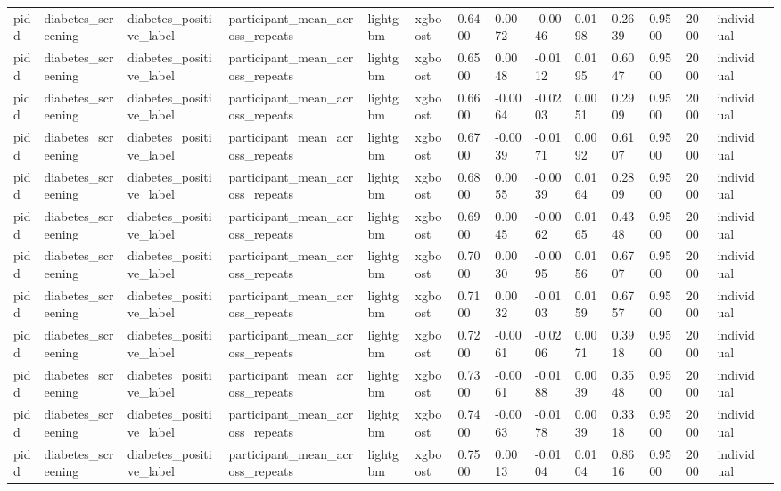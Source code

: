 \begin{tabular}{lllllllllllllll}
pidd & diabetes\_screening & diabetes\_positive\_label & participant\_mean\_across\_repeats & lightgbm & xgboost & 0.6400 & 0.0072 & -0.0046 & 0.0198 & 0.2639 & 0.9500 & 2000 & individual &  \\
pidd & diabetes\_screening & diabetes\_positive\_label & participant\_mean\_across\_repeats & lightgbm & xgboost & 0.6500 & 0.0048 & -0.0112 & 0.0195 & 0.6047 & 0.9500 & 2000 & individual &  \\
pidd & diabetes\_screening & diabetes\_positive\_label & participant\_mean\_across\_repeats & lightgbm & xgboost & 0.6600 & -0.0064 & -0.0203 & 0.0051 & 0.2909 & 0.9500 & 2000 & individual &  \\
pidd & diabetes\_screening & diabetes\_positive\_label & participant\_mean\_across\_repeats & lightgbm & xgboost & 0.6700 & -0.0039 & -0.0171 & 0.0092 & 0.6107 & 0.9500 & 2000 & individual &  \\
pidd & diabetes\_screening & diabetes\_positive\_label & participant\_mean\_across\_repeats & lightgbm & xgboost & 0.6800 & 0.0055 & -0.0039 & 0.0164 & 0.2809 & 0.9500 & 2000 & individual &  \\
pidd & diabetes\_screening & diabetes\_positive\_label & participant\_mean\_across\_repeats & lightgbm & xgboost & 0.6900 & 0.0045 & -0.0062 & 0.0165 & 0.4348 & 0.9500 & 2000 & individual &  \\
pidd & diabetes\_screening & diabetes\_positive\_label & participant\_mean\_across\_repeats & lightgbm & xgboost & 0.7000 & 0.0030 & -0.0095 & 0.0156 & 0.6707 & 0.9500 & 2000 & individual &  \\
pidd & diabetes\_screening & diabetes\_positive\_label & participant\_mean\_across\_repeats & lightgbm & xgboost & 0.7100 & 0.0032 & -0.0103 & 0.0159 & 0.6757 & 0.9500 & 2000 & individual &  \\
pidd & diabetes\_screening & diabetes\_positive\_label & participant\_mean\_across\_repeats & lightgbm & xgboost & 0.7200 & -0.0061 & -0.0206 & 0.0071 & 0.3918 & 0.9500 & 2000 & individual &  \\
pidd & diabetes\_screening & diabetes\_positive\_label & participant\_mean\_across\_repeats & lightgbm & xgboost & 0.7300 & -0.0061 & -0.0188 & 0.0039 & 0.3548 & 0.9500 & 2000 & individual &  \\
pidd & diabetes\_screening & diabetes\_positive\_label & participant\_mean\_across\_repeats & lightgbm & xgboost & 0.7400 & -0.0063 & -0.0178 & 0.0039 & 0.3318 & 0.9500 & 2000 & individual &  \\
pidd & diabetes\_screening & diabetes\_positive\_label & participant\_mean\_across\_repeats & lightgbm & xgboost & 0.7500 & 0.0013 & -0.0104 & 0.0104 & 0.8616 & 0.9500 & 2000 & individual &  \\

\end{tabular}

